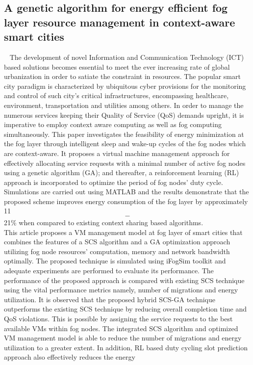 \subsection{A genetic algorithm for energy efficient fog layer resource management in context-aware smart cities}~\cite{}
The development of novel Information and Communication Technology (ICT) based solutions becomes essential
to meet the ever increasing rate of global urbanization in order to satiate the constraint in resources. The popular
smart city paradigm is characterized by ubiquitous cyber provisions for the monitoring and control of such city’s
critical infrastructures, encompassing healthcare, environment, transportation and utilities among others. In
order to manage the numerous services keeping their Quality of Service (QoS) demands upright, it is imperative
to employ context aware computing as well as fog computing simultaneously. This paper investigates the
feasibility of energy minimization at the fog layer through intelligent sleep and wake-up cycles of the fog nodes
which are context-aware. It proposes a virtual machine management approach for effectively allocating service
requests with a minimal number of active fog nodes using a genetic algorithm (GA); 
and thereafter, a reinforcement learning (RL) approach is incorporated to optimize the period of fog nodes’ duty cycle. 
Simulations are carried out using MATLAB and the results demonstrate that the proposed scheme improves energy consumption
of the fog layer by approximately 11$$-$$21\% when compared to existing context sharing based algorithms. \\
This article proposes a VM management model at fog layer of smart
cities that combines the features of a SCS algorithm and a GA optimization approach utilizing fog node resources’ computation,
memory and network bandwidth optimally. The proposed technique is
simulated using iFogSim toolkit and adequate experiments are performed to evaluate its performance. The performance of the proposed
approach is compared with existing SCS technique using the vital performance metrics namely, number of migrations and energy utilization.
It is observed that the proposed hybrid SCS-GA technique outperforms
the existing SCS technique by reducing overall completion time and QoS
violations. This is possible by assigning the service requests to the best
available VMs within fog nodes. The integrated SCS algorithm and
optimized VM management model is able to reduce the number of migrations and energy utilization to a greater extent. In addition, RL based
duty cycling slot prediction approach also effectively reduces the energy
